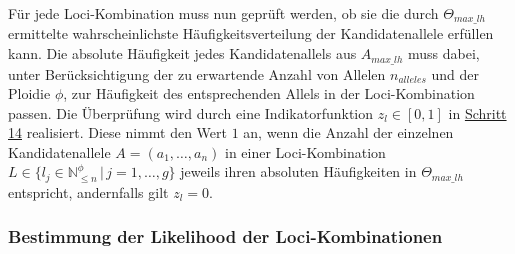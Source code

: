 Für jede Loci-Kombination muss nun geprüft werden, ob sie die durch $\Theta_{max\_lh}$ ermittelte wahrscheinlichste Häufigkeitsverteilung der Kandidatenallele erfüllen kann. Die absolute Häufigkeit jedes Kandidatenallels aus $A_{max\_lh}$ muss dabei, unter Berücksichtigung der zu erwartende Anzahl von Allelen $n_{alleles}$ und der Ploidie $\phi$, zur Häufigkeit des entsprechenden Allels in der Loci-Kombination passen. Die Überprüfung wird durch eine Indikatorfunktion $ z_{l} \in {[0,1]} $ in \hyperref[step14]{Schritt 14\label{step14txt}} realisiert. Diese nimmt den Wert $1$ an, wenn die Anzahl der einzelnen Kandidatenallele $A = (a_{1}, \dots, a_{n})$ in einer Loci-Kombination $L \in \{l_{j} \in \mathds{N}_{\leq n}^\phi \, | \, j=1, \dots, g\}$ jeweils ihren absoluten Häufigkeiten in $\Theta_{max\_lh}$ entspricht, andernfalls gilt $ z_{l} = 0 $.
\vspace{-0.5cm}
\begin{center}
\end{center}

\subsubsection{Bestimmung der Likelihood der Loci-Kombinationen} \label{sol_loci_lh_max}

